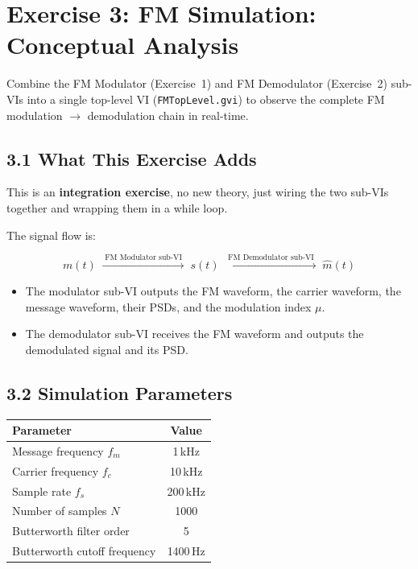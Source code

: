 \documentclass[../../main.tex]{subfiles}
\begin{document}
\newpage

\section{Exercise 3: FM Simulation: Conceptual Analysis}

\begin{GoalBox}
Combine the FM Modulator (Exercise~1) and FM Demodulator (Exercise~2) sub-VIs into a single top-level VI (\texttt{FMTopLevel.gvi}) to observe the complete FM modulation $\to$ demodulation chain in real-time.
\end{GoalBox}

\vspace{1em}

\subsection{3.1 \; What This Exercise Adds}

This is an \textbf{integration exercise}, no new theory, just wiring the two sub-VIs together and wrapping them in a while loop.

The signal flow is:

\[
  m(t) \;\xrightarrow{\;\text{FM Modulator sub-VI}\;}\; s(t) \;\xrightarrow{\;\text{FM Demodulator sub-VI}\;}\; \hat{m}(t)
\]

\begin{itemize}[leftmargin=1.5em]
  \item The modulator sub-VI outputs the FM waveform, the carrier waveform, the message waveform, their PSDs, and the modulation index $\mu$.
  \item The demodulator sub-VI receives the FM waveform and outputs the demodulated signal and its PSD.
\end{itemize}

\vspace{0.5em}

\subsection{3.2 \; Simulation Parameters}

\begin{center}
\begin{tabular}{lc}
\toprule
\textbf{Parameter} & \textbf{Value} \\
\midrule
Message frequency $f_m$ & 1\,kHz \\
Carrier frequency $f_c$ & 10\,kHz \\
Sample rate $f_s$ & 200\,kHz \\
Number of samples $N$ & 1000 \\
Butterworth filter order & 5 \\
Butterworth cutoff frequency & 1400\,Hz \\
\bottomrule
\end{tabular}
\end{center}
\end{document}
